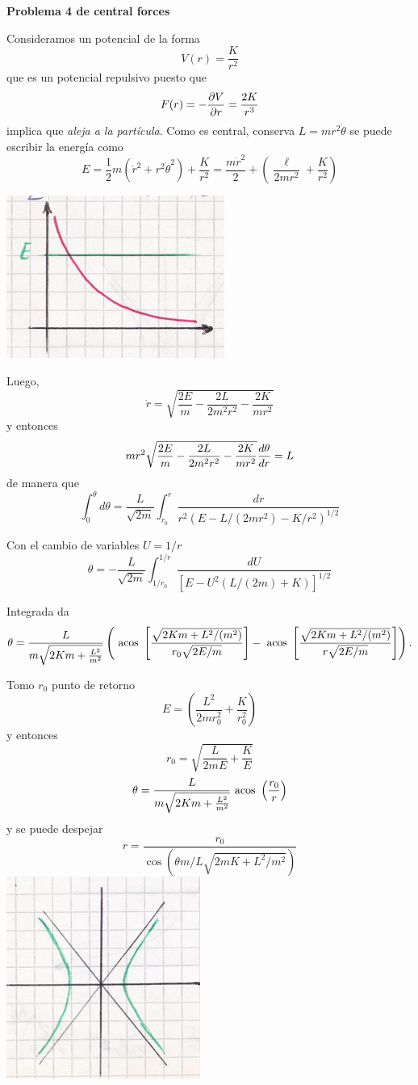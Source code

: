 \documentclass[10pt,oneside]{CBFT_book}
\begin{document}
\begin{ejemplo}{\bf Problema 4 de central forces}

Consideramos un potencial de la forma 
\[
	V(r) = \frac{K}{r^2}
\]
que es un potencial repulsivo puesto que 
\[
	F(r) = -\frac{\partial^{\hspace{-0.05em}} {V}}{\partial {r}^{\hspace{-0.05em}}} = \frac{2K}{r^3}
\]
implica que {\it aleja a la partícula}.
Como es central, conserva $ L = m r^2 \dot{\theta} $ se puede escribir la energía como
\[
	E = \frac 1 2 m ( \dot{r}^2 + r^2 \dot{\theta}^2 ) + \frac K {r^2} = \frac{ m \dot{r}^2 }{2} +
	\left( \frac{ \ell }{ 2 m r^2 } + \frac{ K }{ r^2 } \right)
\]

\includegraphics[scale=0.3]{images/fig_mc_potencial_central_4.jpg}

Luego,
\[
	\dot{r} = \sqrt{ \frac{2E}{m} - \frac{2L}{2m^2r^2} - \frac{2K}{mr^2} }
\]
y entonces
\[
	m r^2 \sqrt{ \frac{2E}{m} - \frac{2L}{2m^2r^2} - \frac{2K}{mr^2} } \frac{d^{\hspace{-0.05em}} {\theta}}{d {r}^{\hspace{-0.05em}}} = L
\]
de manera que 
\[
	\int_0^{\theta} d\theta = \frac{L}{\sqrt{2m}} \int_{r_0}^{r} \frac{dr}{r^2( E - L/(2mr^2) - K/r^2 )^{1/2}}
\]

Con el cambio de variables $ U = 1 / r $
\[
	\theta = -\frac{L}{\sqrt{2m}} \int_{1/r_0}^{1/r} \frac{ dU }{ [ E - U^2( L/(2m) + K )]^{1/2} }
\]

Integrada da
\[
	\theta = \frac{L}{m\sqrt{2Km + \frac{L^2}{m^2}}}
	\left( \text{ acos }\left[ \frac{ \sqrt{2Km + L^2/(m^2)} }{r_0\sqrt{2E/m}} \right] - 
	\text{ acos }\left[ \frac{\sqrt{2Km + L^2/(m^2)}}{r\sqrt{2E/m}}\right] \right).
\]

Tomo $r_0$ punto de retorno
\[
	E = \left( \frac{L^2}{2mr_0^2} + \frac{K}{r_0^2} \right)
\]
y entonces
\[
	r_0 = \sqrt{ \frac L {2mE} + \frac K E }
\]
\[
	\theta = \frac{L}{m\sqrt{2Km + \frac{L^2}{m^2}}} \text{ acos }\left(\frac{r_0}{r}\right)
\]
y se puede despejar
\[
	r = \frac{ r_0 }{\cos( \theta m / L \sqrt{ 2 m K + L^2 / m^2 } )}
\]
\includegraphics[scale=0.3]{images/fig_mc_potencial_central_4_orbitas.jpg}


\end{ejemplo}
\end{document}
